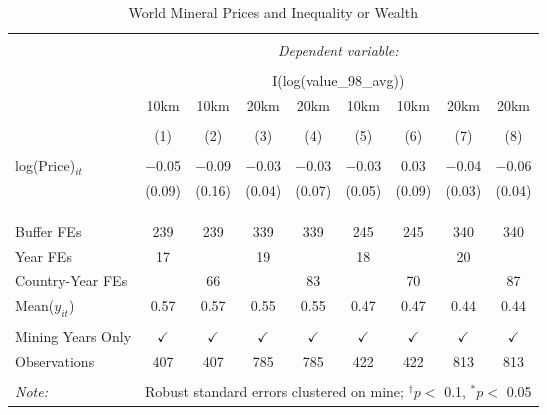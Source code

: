 
\begin{table}[ht!] \centering 
  \caption{World Mineral Prices and Inequality or Wealth} 
  \label{tab:did_dhs_inequality_price} 
\begin{tabular}{@{\extracolsep{0pt}}lcccccccc} 
\\[-1.8ex]\hline 
\hline \\[-1.8ex] 
 & \multicolumn{8}{c}{\textit{Dependent variable:}} \\ 
\cline{2-9} 
\\[-1.8ex] & \multicolumn{8}{c}{I(log(value\_98\_avg))} \\ 
 & 10km & 10km & 20km & 20km & 10km & 10km & 20km & 20km \\ 
\\[-1.8ex] & (1) & (2) & (3) & (4) & (5) & (6) & (7) & (8)\\ 
\hline \\[-1.8ex] 
 log(Price)$_{it}$ & $-$0.05 & $-$0.09 & $-$0.03 & $-$0.03 & $-$0.03 & 0.03 & $-$0.04 & $-$0.06 \\ 
  & (0.09) & (0.16) & (0.04) & (0.07) & (0.05) & (0.09) & (0.03) & (0.04) \\ 
  & & & & & & & & \\ 
\hline \\[-1.8ex] 
\hline \\[-1.8ex] Buffer FEs & 239 & 239 & 339 & 339 & 245 & 245 & 340 & 340 \\ 
Year FEs & 17 &  & 19 &  & 18 &  & 20 &  \\ 
Country-Year FEs &  & 66 &  & 83 &  & 70 &  & 87 \\ 
Mean($y_{it}$) & 0.57 & 0.57 & 0.55 & 0.55 & 0.47 & 0.47 & 0.44 & 0.44 \\ 
\hline \\[-1.8ex] Mining Years Only & $\checkmark$ & $\checkmark$ & $\checkmark$ & $\checkmark$ & $\checkmark$ & $\checkmark$ & $\checkmark$ & $\checkmark$ \\ 
Observations & 407 & 407 & 785 & 785 & 422 & 422 & 813 & 813 \\ 
\hline 
\hline \\[-1.8ex] 
\textit{Note:}  & \multicolumn{8}{r}{Robust standard errors clustered on mine; $^{\dagger} p <$ 0.1, $^*p <$ 0.05} \\ 
\end{tabular} 
\end{table} 
